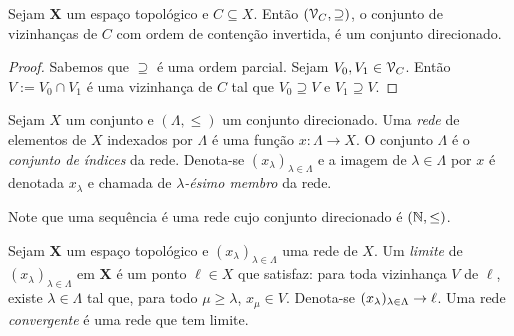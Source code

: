 \begin{prop}
Sejam $\bm X$ um espaço topológico e $C \subseteq X$. Então $(\mathcal{V}_C,\supseteq)$, o conjunto de vizinhanças de $C$ com ordem de contenção invertida, é um conjunto direcionado.
\end{prop}
\begin{proof}
Sabemos que $\supseteq$ é uma ordem parcial. Sejam $V_0,V_1 \in \mathcal{V}_C$. Então $V := V_0 \cap V_1$ é uma vizinhança de $C$ tal que $V_0 \supseteq V$ e $V_1 \supseteq V$.
\end{proof}

\begin{defi}
Sejam $X$ um conjunto e $(\Lambda,\leq)$ um conjunto direcionado. Uma \emph{rede} de elementos de $X$ indexados por $\Lambda$ é uma função $x: \Lambda \to X$. O conjunto $\Lambda$ é o \emph{conjunto de índices} da rede. Denota-se $(x_\lambda)_{\lambda \in \Lambda}$ e a imagem de $\lambda \in \Lambda$ por $x$ é denotada $x_\lambda$ e chamada de \emph{$\lambda$-ésimo membro} da rede.
\end{defi}

Note que uma sequência é uma rede cujo conjunto direcionado é $(\mathbb{N},\leq)$.

\begin{defi}
Sejam $\bm X$ um espaço topológico e $(x_\lambda)_{\lambda \in \Lambda}$ uma rede de $X$. Um \emph{limite} de $(x_\lambda)_{\lambda \in \Lambda}$ em $\bm X$ é um ponto $\ell \in X$ que satisfaz: para toda vizinhança $V$ de $\ell$, existe $\lambda \in \Lambda$ tal que, para todo $\mu \geq \lambda$, $x_\mu \in V$. Denota-se $(x_\lambda)_{\lambda \in \Lambda} \rightarrow \ell$. Uma rede \emph{convergente} é uma rede que tem limite.
\end{defi}

